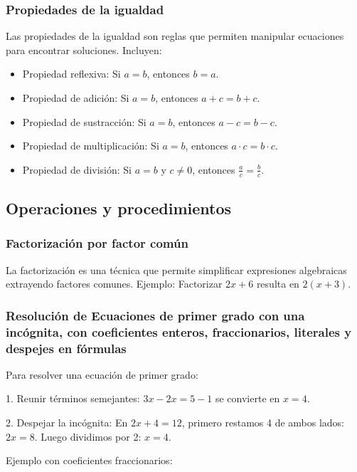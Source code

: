 \subsubsection{Propiedades de la igualdad}

Las propiedades de la igualdad son reglas que permiten manipular ecuaciones para encontrar soluciones. Incluyen:

\begin{itemize}
    \item Propiedad reflexiva: Si \(a = b\), entonces \(b = a\).
    \item Propiedad de adición: Si \(a = b\), entonces \(a + c = b + c\).
    \item Propiedad de sustracción: Si \(a = b\), entonces \(a - c = b - c\).
    \item Propiedad de multiplicación: Si \(a = b\), entonces \(a \cdot c = b \cdot c\).
    \item Propiedad de división: Si \(a = b\) y \(c \neq 0\), entonces \(\frac{a}{c} = \frac{b}{c}\).
\end{itemize}
\subsection{Operaciones y procedimientos}

\subsubsection{Factorización por factor común}

La factorización es una técnica que permite simplificar expresiones algebraicas extrayendo factores comunes. Ejemplo: Factorizar \(2x + 6\) resulta en \(2(x + 3)\).

\subsubsection{Resolución de Ecuaciones de primer grado con una incógnita, con coeficientes enteros, fraccionarios, literales y despejes en fórmulas}

Para resolver una ecuación de primer grado:

1. Reunir términos semejantes: \(3x - 2x = 5 - 1\) se convierte en \(x = 4\).

2. Despejar la incógnita: En \(2x + 4 = 12\), primero restamos 4 de ambos lados: \(2x = 8\). Luego dividimos por 2: \(x = 4\).

Ejemplo con coeficientes fraccionarios:

